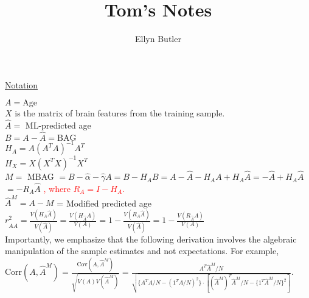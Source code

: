 \documentclass[40pt]{article}
\begin{document}
 
 
\title{Tom's Notes}%
\author{Ellyn Butler} %
 
\maketitle

\underline{Notation}

$A = \text{Age}$\\

$X$ is the matrix of brain features from the training sample. \\

$\hat{A} =$ ML-predicted age \\

$B = A - \hat{A} = \text{BAG}$ \\

$H_A = A (A^TA)^{-1}A^T$ \\

$H_X = X (X^TX)^{-1}X^T$ \\

$M =$ MBAG $= B -  \hat{\alpha} - \hat{\gamma} A = B - H_A B = A - \hat{A} - H_AA + H_A \hat{A} = -\hat{A} + H_A \hat{A}$ \\

$= -R_A \hat{A}$ \textcolor{red}{, where $R_A=I-H_A$.} \\

$\hat{A}^M = A - M$ = Modified predicted age \\

$r_{\hat{A}A}^2 = \frac{V(H_A \hat{A})}{V(\hat{A})} = \frac{V(H_{\hat{A}} A)}{V(A)} = 1 - \frac{V(R_A \hat{A})}{V(\hat{A})} = 1 - \frac{V(R_{\hat{A}} A)}{V(A)}$ \\ %

Importantly, we emphasize that the following derivation involves the algebraic manipulation of the sample estimates and not expectations. For example, ${\textrm{Corr}}(A, \hat{A}^M) = \frac{\textrm{Cov}(A, \hat{A}^M)}{\sqrt{V(A)V(\hat{A}^M)}} = \frac{A^T\hat{A}^M/N} {\sqrt{\{A^TA/N-(1^TA/N)^2\}\cdot [(\hat{A}^M)^T\hat{A}^M/N-\{1^T\hat{A}^M/N\}^2]}}$.
\\
\end{document}
